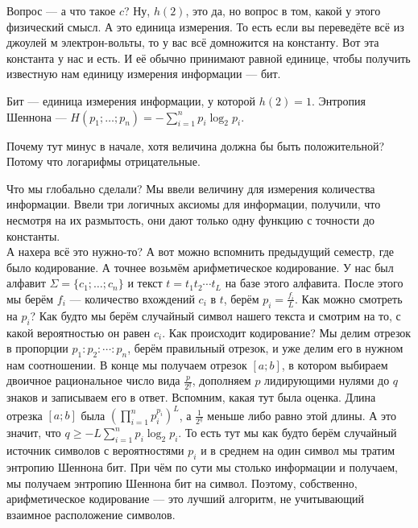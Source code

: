 \documentclass{article}
\begin{document}
\begin{itemize}
        \begin{Comment}
            Вопрос --- а что такое $c$? Ну, $h(2)$, это да, но вопрос в том, какой у этого физический смысл. А это единица измерения. То есть если вы переведёте всё из джоулей м электрон-вольты, то у вас всё домножится на константу. Вот эта константа у нас и есть. И её обычно принимают равной единице, чтобы получить известную нам единицу измерения информации --- бит.
        \end{Comment}
        \dfn Бит --- единица измерения информации, у которой $h(2)=1$.
        \dfn Энтропия Шеннона --- $H(p_1;\ldots;p_n)=-\sum\limits_{i=1}^np_i\log_2p_i$.
        \begin{Comment}
            Почему тут минус в начале, хотя величина должна бы быть положительной? Потому что логарифмы отрицательные.
        \end{Comment}
        \begin{Comment}
            Что мы глобально сделали? Мы ввели величину для измерения количества информации. Ввели три логичных аксиомы для информации, получили, что несмотря на их размытость, они дают только одну функцию с точности до константы.\\
            А нахера всё это нужно-то? А вот можно вспомнить предыдущий семестр, где было кодирование. А точнее возьмём арифметическое кодирование. У нас был алфавит $\Sigma=\{c_1;\ldots;c_n\}$ и текст $t=t_1t_2\cdots t_L$ на базе этого алфавита. После этого мы берём $f_i$ --- количество вхождений $c_i$ в $t$, берём $p_i=\frac{f_i}L$. Как можно смотреть на $p_i$? Как будто мы берём случайный символ нашего текста и смотрим на то, с какой вероятностью он равен $c_i$. Как происходит кодирование? Мы делим отрезок в пропорции $p_1:p_2:\cdots:p_n$, берём правильный отрезок, и уже делим его в нужном нам соотношении. В конце мы получаем отрезок $[a;b]$, в котором выбираем двоичное рациональное число вида $\frac p{2^q}$, дополняем $p$ лидирующими нулями до $q$ знаков и записываем его в ответ. Вспомним, какая тут была оценка. Длина отрезка $[a;b]$ была $\left(\prod_{i=1}^np_i^{p_i}\right)^L$, а $\frac1{2^q}$ меньше либо равно этой длины. А это значит, что $q\geqslant-L\sum\limits_{i=1}^np_i\log_2p_i$. То есть тут мы как будто берём случайный источник символов с вероятностями $p_i$ и в среднем на один символ мы тратим энтропию Шеннона бит. При чём по сути мы столько информации и получаем, мы получаем энтропию Шеннона бит на символ. Поэтому, собственно, арифметическое кодирование --- это лучший алгоритм, не учитывающий взаимное расположение символов.
        \end{Comment}

\end{itemize}
\end{document}
